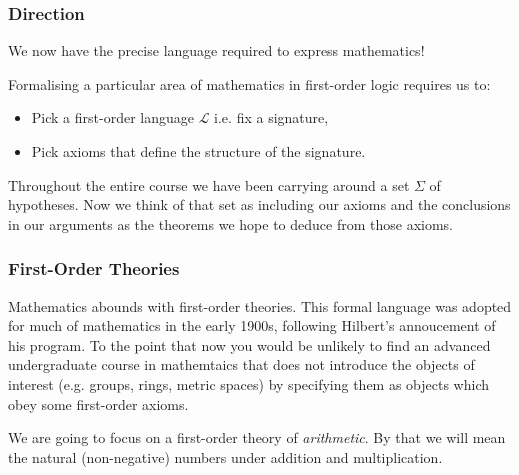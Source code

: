 \documentclass{beamer}
\theoremstyle{indentDefn} \newtheorem{defn}[]{Definition}
\begin{document}
	
	

\begin{frame}
  \frametitle{Direction}

	We now have the precise language required to express mathematics!
	
	\vspace{5mm}
	
	Formalising a particular area of mathematics in first-order logic requires us to:
	
	\begin{itemize}
		\item Pick a first-order language $\mathcal{L}$ i.e. fix a signature,
		\item Pick axioms that define the structure of the signature. 
	\end{itemize}
	
	Throughout the entire course we have been carrying around a set $\Sigma$ of hypotheses. Now we think of that set as including our axioms and the conclusions in our arguments as the theorems we hope to deduce from those axioms. 
\end{frame}

\begin{frame}
	\frametitle{First-Order Theories}
	
	Mathematics abounds with first-order theories. This formal language was adopted for much of mathematics in the early 1900s, following Hilbert's annoucement of his program. To the point that now you would be unlikely to find an advanced undergraduate course in mathemtaics that does not introduce the objects of interest (e.g. groups, rings, metric spaces) by specifying them as objects which obey some first-order axioms. 
	
	\vspace{0.2cm}
	
	We are going to focus on a first-order theory of \textit{arithmetic}. By that we will mean the natural (non-negative) numbers under addition and multiplication.

\end{frame}
\end{document}
